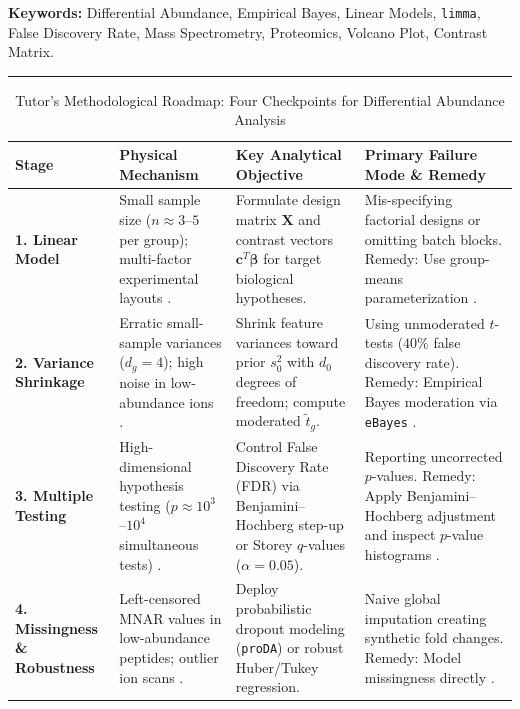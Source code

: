 \documentclass[11pt,twoside,openright]{book}
\begin{document}
\noindent
\textbf{Keywords:} Differential Abundance, Empirical Bayes, Linear Models, \texttt{limma}, False Discovery Rate, Mass Spectrometry, Proteomics, Volcano Plot, Contrast Matrix.

\vspace{0.8em}
\noindent\rule{\textwidth}{0.4pt}


\begin{table}[ht]
\centering
\caption{Tutor's Methodological Roadmap: Four Checkpoints for Differential Abundance Analysis}
\label{tab:diff_roadmap}
\small
\begin{tabularx}{\textwidth}{l p{3.8cm} p{4.2cm} X}
\toprule
\textbf{Stage} & \textbf{Physical Mechanism} & \textbf{Key Analytical Objective} & \textbf{Primary Failure Mode \& Remedy} \\
\midrule
\textbf{1. Linear Model} & Small sample size ($n \approx 3$--$5$ per group); multi-factor experimental layouts \cite{smyth2004linear, ritchie2015limma}. & Formulate design matrix $\mathbf{X}$ and contrast vectors $\mathbf{c}^T \boldsymbol{\beta}$ for target biological hypotheses. & Mis-specifying factorial designs or omitting batch blocks. Remedy: Use group-means parameterization \cite{law2014voom}. \\
\addlinespace
\textbf{2. Variance Shrinkage} & Erratic small-sample variances ($d_g = 4$); high noise in low-abundance ions \cite{karpievitch2012statistical, lazar2016accounting}. & Shrink feature variances toward prior $s_0^2$ with $d_0$ degrees of freedom; compute moderated $\tilde{t}_g$. & Using unmoderated $t$-tests ($40\%$ false discovery rate). Remedy: Empirical Bayes moderation via \texttt{eBayes} \cite{smyth2004linear, phipson2016robust}. \\
\addlinespace
\textbf{3. Multiple Testing} & High-dimensional hypothesis testing ($p \approx 10^3$--$10^4$ simultaneous tests) \cite{benjamini1995controlling, storey2003statistical}. & Control False Discovery Rate (FDR) via Benjamini--Hochberg step-up or Storey $q$-values ($\alpha = 0.05$). & Reporting uncorrected $p$-values. Remedy: Apply Benjamini--Hochberg adjustment and inspect $p$-value histograms \cite{efron2004large}. \\
\addlinespace
\textbf{4. Missingness \& Robustness} & Left-censored MNAR values in low-abundance peptides; outlier ion scans \cite{ahlmann2020proda, goeminne2016msqrob2}. & Deploy probabilistic dropout modeling (\texttt{proDA}) or robust Huber/Tukey regression. & Naive global imputation creating synthetic fold changes. Remedy: Model missingness directly \cite{choi2014msstats}. \\
\bottomrule
\end{tabularx}
\end{table}
\end{document}
